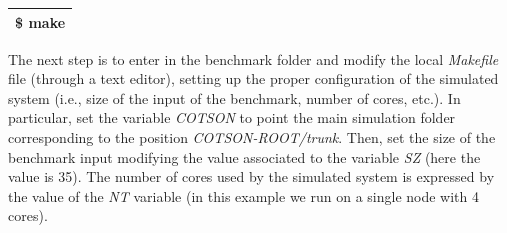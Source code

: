\documentclass[a4paper]{article}
\begin{document}
\begin{flushleft}
\tablehead{}
\begin{supertabular}{|m{6.34626in}|}
\hline
{}\ttfamily \$ make\\\hline
\end{supertabular}
\end{flushleft}
{
The next step is to enter in the benchmark folder and modify the local
\textit{Makefile} file (through a text editor), setting up the proper
configuration of the simulated system (i.e., size of the input of the
benchmark, number of cores, etc.). In particular, set the variable
\textit{COTSON} to point the main simulation folder corresponding to
the position \textit{COTSON-ROOT/trunk}. Then, set the size of the
benchmark input modifying the value associated to the variable
\textit{SZ} (here the value is 35). The number of cores used by the
simulated system is expressed by the value of the \textit{NT} variable
(in this example we run on a single node with 4 cores).}
\end{document}
